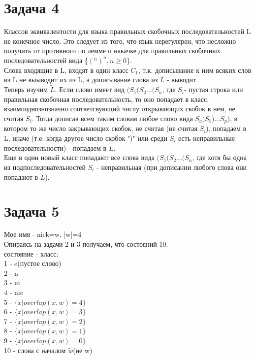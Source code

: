 \documentclass[a4paper,12pt]{article} %
\begin{document}
\section*{Задача 4}
Классов эквивалентости для языка правильных скобочных последовательностей L не конечное число. Это следует из того, что язык нерегулярен, что несложно получить от противного по лемме о накачке для правильных скобочных последовательностей вида \{$(^n)^n, n\geq 0$\}. \\

Слова входящие в L, входят в один класс $C_1$, т.к. дописывание к ним всяких слов из L не выыводит их из L, а дописывание  слова из $\tilde{L}$ - выводит.\\

Теперь изучим $\tilde{L}$. Если слово имеет вид $(S_1(S_2...(S_n$, где $S_i$- пустая строка или правильная скобочная последовательность, то оно попадает в класс, взаимооднознозначно соответсвующий числу открывающих скобок в нем, не считая $S_i$. Тогда дописав всем таким словам любое слово вида $S_a)S_b)...S_p)$, в котором то же число закрывающих скобок, не считая (не считая $S_i$), попадаем в L, иначе (т.е. когда другое число скобок ")" или среди $S_i$ есть неправильные последовательности) - попадаем в $\tilde{L}$.\\

 Еще в один новый класс попадают все слова вида $(S_1(S_2...(S_n$, где хотя бы одна из подпоследовательностей $S_i$ - неправильная (при дописании любого слова они попадают в $\tilde{L}$).\\
 
 
\section*{Задача 5}
Мое имя - nick=w, |w|=4\\

Опираясь на задачи 2 и 3 получаем, что состояний 10.\\
состояние - класс:\\
1 - e(пустое слово)\\
2 - n\\
3 - ni\\
4 - nic\\
5 - $\{x|overlap(x,w)=4\}$\\
6 - $\{x|overlap(x,w)=3\}$\\
7 - $\{x|overlap(x,w)=2\}$\\
8 - $\{x|overlap(x,w)=1\}$\\
9 - $\{x|overlap(x,w)=0\}$\\
10 - слова с началом  $\tilde{w}$(не w)
\\
\end{document}

